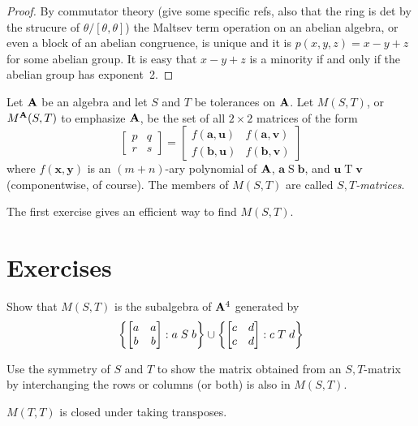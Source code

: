 \begin{proof}
By commutator theory (give some specific refs, also that the ring
is det by the strucure of $\theta/[\theta,\theta]$) 
the Maltsev term operation on an
abelian algebra, or even a block of an abelian congruence, 
is unique and it is $p(x,y,z) = x - y + z$ for
some abelian group. It is easy that $x - y + z$ is a minority
if and only if the abelian group has exponent~2.
\end{proof}





Let $\mathbf{A}$ be an algebra and let $S$ and $T$ be tolerances
on $\mathbf{A}$. 
Let $M(S,T)$, or $M^{\mathbf{A}}(S,T)$ to emphasize $\mathbf{A}$,
be the set of all $2 \times 2$ matrices of the form
\begin{equation}\label{eq1}
\begin{bmatrix}
p&q\\
r&s
\end{bmatrix}
=
\begin{bmatrix}
f(\mathbf{a},\mathbf{u})&f(\mathbf{a},\mathbf{v})\\
f(\mathbf{b},\mathbf{u})&f(\mathbf{b},\mathbf{v})
\end{bmatrix}
\end{equation}
where $f(\mathbf{x},\mathbf{y})$ is an $(m+n)$-ary polynomial of
$\mathbf{A}$, $\mathbf{a} \mathrel{S} \mathbf{b}$, and 
$\mathbf{u} \mathrel{T} \mathbf{v}$
(componentwise, of course). The members of $M(S,T)$ are called
\emph{$S,T$-matrices}.

The first exercise gives an efficient way to find $M(S,T)$.

\section*{Exercises}

\begin{exercises}

\prob
Show that $M(S,T)$ is the subalgebra of $\mathbf{A}^4$ generated by
\[
\left\{
\begin{bmatrix}
a&a\\
b&b
\end{bmatrix} : a \mathrel{S} b\right\}
\union
\left\{
\begin{bmatrix}
c&d\\
c&d
\end{bmatrix} : c \mathrel{T} d\right\}
\]

\prob
Use the symmetry of $S$ and $T$ to show the matrix obtained from an
$S,T$-matrix by interchanging the rows or columns (or both) is also
in $M(S,T)$. 

\prob
$M(T,T)$ is closed under taking transposes. 

\end{exercises}

